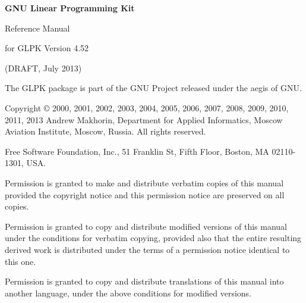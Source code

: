 \documentclass[11pt]{report}
\begin{document}
\thispagestyle{empty}

\begin{center}

\vspace*{1.5in}

\begin{huge}
\sf\bfseries GNU Linear Programming Kit
\end{huge}

\vspace{0.5in}

\begin{LARGE}
\sf Reference Manual
\end{LARGE}

\vspace{0.5in}

\begin{LARGE}
\sf for GLPK Version 4.52
\end{LARGE}

\vspace{0.5in}
\begin{Large}
\sf (DRAFT, July 2013)
\end{Large}
\end{center}

\newpage

\vspace*{1in}

\vfill

\noindent
The GLPK package is part of the GNU Project released under the aegis of
GNU.

\noindent
Copyright \copyright{} 2000, 2001, 2002, 2003, 2004, 2005, 2006, 2007,
2008, 2009, 2010, 2011, 2013 Andrew Makhorin, Department for Applied
Informatics, Moscow Aviation Institute, Moscow, Russia. All rights
reserved.

\noindent
Free Software Foundation, Inc., 51 Franklin St, Fifth Floor, Boston, MA
02110-1301, USA.

\noindent
Permission is granted to make and distribute verbatim copies of this
manual provided the copyright notice and this permission notice are
preserved on all copies.

\noindent
Permission is granted to copy and distribute modified versions of this
manual under the conditions for verbatim copying, provided also that
the entire resulting derived work is distributed under the terms of
a permission notice identical to this one.

\noindent
Permission is granted to copy and distribute translations of this
manual into another language, under the above conditions for modified
versions.
\end{document}
